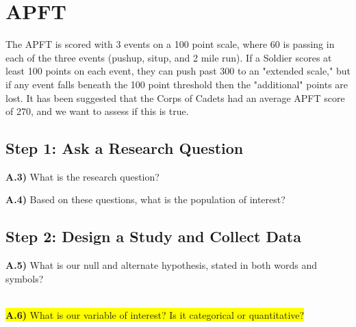 \documentclass{article}
\newif\ifPrintSolution
\newcommand{\sol}[1]{\ifPrintSolution {\color{blue} #1 } \fi}
\begin{document}
\sol{Some variation, but a categorical could be "Sex", quantitative could include "age, IOCT$\_$Score, AFCT$\_$score, etc.}


\section*{APFT}

The APFT is scored with 3 events on a 100 point scale, where 60 is passing in each of the three events (pushup, situp, and 2 mile run). If a Soldier scores at least 100 points on each event, they can push past 300 to an "extended scale," but if any event falls beneath the 100 point threshold then the "additional" points are lost. It has been suggested that the Corps of Cadets had an average APFT score of 270, and we want to assess if this is true.

\subsection*{Step 1: Ask a Research Question}

\textbf{A.3)} What is the research question?

\sol{Is the Corps of Cadets average APFT score equal to 270 or not?}

\vspace{0.2in}

\textbf{A.4)} Based on these questions, what is the population of interest?

\sol{The population of interest is the Corps of Cadets}

\vspace{0.2in}

\subsection*{Step 2: Design a Study and Collect Data}

\textbf{A.5)} What is our null and alternate hypothesis, stated in both words and symbols?

\sol{$H_0: \mu = 270$. The true mean APFT score for the Corps of Cadets is 270. \\

$H_a: \mu \ne 270$. The true mean APFT score for the Corps of Cadets is not 270.}

\vspace{0.2in}

\;
\\ 

\colorbox{yellow}{\textbf{A.6)} What is our variable of interest? Is it categorical or quantitative?}
\end{document}
